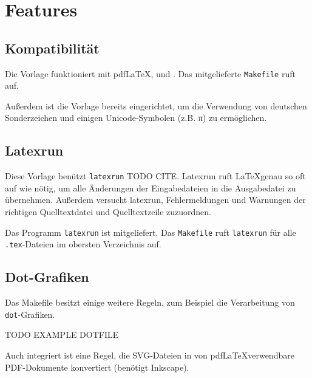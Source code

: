 \chapter{Features}

\section{Kompatibilität}

Die Vorlage funktioniert mit pdf\LaTeX, \XeLaTeX und \LuaLaTeX. Das mitgelieferte \texttt{Makefile}
ruft \XeLaTeX auf.

Außerdem ist die Vorlage bereits eingerichtet, um die Verwendung von deutschen Sonderzeichen und
einigen Unicode-Symbolen (z.B. π) zu ermöglichen.

\section{Latexrun}

Diese Vorlage benützt \texttt{latexrun} TODO CITE. Latexrun ruft \LaTeX genau so oft auf wie nötig,
um alle Änderungen der Eingabedateien in die Ausgabedatei zu übernehmen. Außerdem versucht latexrun,
Fehlermeldungen und Warnungen der richtigen Quelltextdatei und Quelltextzeile zuzuordnen.

Das Programm \texttt{latexrun} ist mitgeliefert. Das \texttt{Makefile} ruft \texttt{latexrun}
für alle \texttt{.tex}-Dateien im obersten Verzeichnis auf.

\section{Dot-Grafiken}
Das Makefile besitzt einige weitere Regeln, zum Beispiel die Verarbeitung von \texttt{dot}-Grafiken.

TODO EXAMPLE DOTFILE

Auch integriert ist eine Regel, die SVG-Dateien in von pdf\LaTeX verwendbare PDF-Dokumente konvertiert
(benötigt Inkscape).
